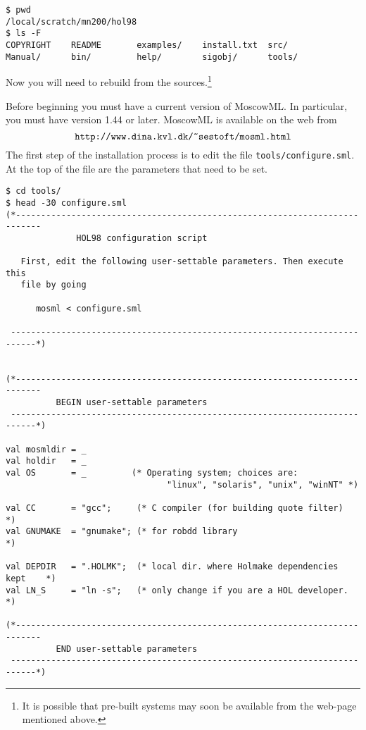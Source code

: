 \setcounter{sessioncount}{1}
\begin{session}
\begin{verbatim}
$ pwd
/local/scratch/mn200/hol98
$ ls -F
COPYRIGHT    README       examples/    install.txt  src/
Manual/      bin/         help/        sigobj/      tools/
\end{verbatim}
\end{session}

Now you will need to rebuild \HOL{} from the sources.\footnote{It is
  possible that pre-built systems may soon be available from the
  web-page mentioned above.}

Before beginning you must have a current version of MoscowML.  In
particular, you must have version 1.44 or later.  MoscowML is
available on the web from
\[
\texttt{http://www.dina.kvl.dk/\~{}sestoft/mosml.html}
\]
The first step of the installation process is to edit the file
\texttt{tools/configure.sml}.  At the top of the file are the
parameters that need to be set.

\begin{session}
\begin{verbatim}
$ cd tools/
$ head -30 configure.sml
(*---------------------------------------------------------------------------
              HOL98 configuration script

   First, edit the following user-settable parameters. Then execute this
   file by going

      mosml < configure.sml

 ---------------------------------------------------------------------------*)


(*---------------------------------------------------------------------------
          BEGIN user-settable parameters
 ---------------------------------------------------------------------------*)

val mosmldir = _
val holdir   = _
val OS       = _         (* Operating system; choices are:
                                "linux", "solaris", "unix", "winNT" *)

val CC       = "gcc";     (* C compiler (for building quote filter)        *)
val GNUMAKE  = "gnumake"; (* for robdd library                             *)

val DEPDIR   = ".HOLMK";  (* local dir. where Holmake dependencies kept    *)
val LN_S     = "ln -s";   (* only change if you are a HOL developer.       *)

(*---------------------------------------------------------------------------
          END user-settable parameters
 ---------------------------------------------------------------------------*)
\end{verbatim}
\end{session}

